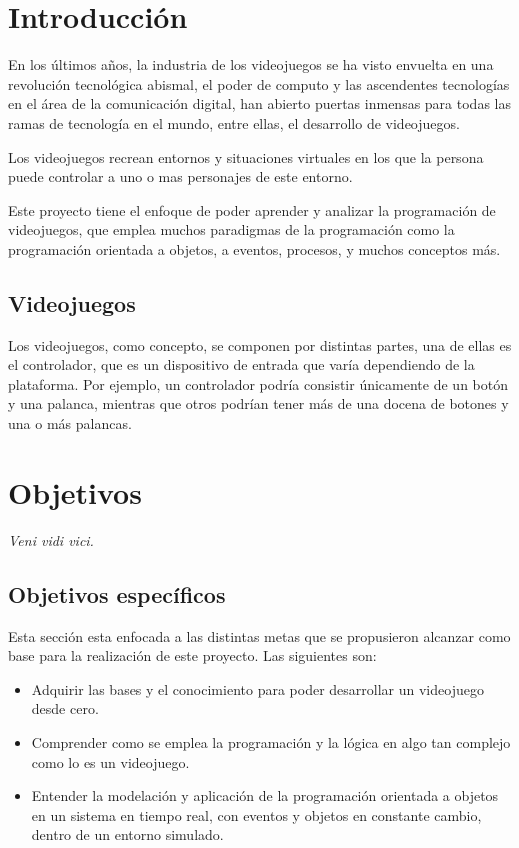 \documentclass[12pt,letterpaper]{report}
\begin{document}
\chapter{Introducción} %

En los últimos años, la industria de los videojuegos se ha visto envuelta en una revolución tecnológica abismal, el poder de computo y las ascendentes tecnologías en el área de la comunicación digital, han abierto puertas inmensas para todas las ramas de tecnología en el mundo, entre ellas, el desarrollo de videojuegos.

Los videojuegos recrean entornos y situaciones virtuales en los que la persona puede controlar a uno o mas personajes de este entorno. 

Este proyecto tiene el enfoque de poder aprender y analizar la programación de videojuegos, que emplea muchos paradigmas de la programación como la programación orientada a objetos, a eventos, procesos, y muchos conceptos más. \cite{Inventa}

\section{Videojuegos}

Los videojuegos, como concepto, se componen por distintas partes, una de ellas es el controlador, que es un dispositivo de entrada que varía dependiendo de la plataforma. Por ejemplo, un controlador podría consistir únicamente de un botón y una palanca, mientras que otros podrían tener más de una docena de botones y una o más palancas.


%
%
%
%
%

\chapter{Objetivos}
\textit{Veni vidi vici.}

\section{Objetivos específicos}

Esta sección esta enfocada a las distintas metas que se propusieron alcanzar como base para la realización de este proyecto. Las siguientes son:

\begin{itemize}

\item Adquirir las bases y el conocimiento para poder desarrollar un videojuego desde cero.

\item Comprender como se emplea la programación y la lógica en algo tan complejo como lo es un videojuego.

\item Entender la modelación y aplicación de la programación orientada a objetos en un sistema en tiempo real, con eventos y objetos en constante cambio, dentro de un entorno simulado.

\end{itemize}
\end{document}
